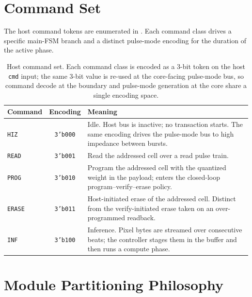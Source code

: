 \section{Command Set}
\label{sec:arch-commands}

The host command tokens are enumerated in . Each
command class drives a specific main-FSM branch and a distinct pulse-mode
encoding for the duration of the active phase.

\begin{table}[h]
    \centering
    \caption{Host command set. Each command class is encoded as a 3-bit
        token on the host \texttt{cmd} input; the same 3-bit value is
        re-used at the core-facing pulse-mode bus, so command decode at
        the boundary and pulse-mode generation at the core share a
        single encoding space.}
    \label{tab:cmd-set}
    \begin{tabularx}{\linewidth}{l c X}
        \toprule
        \textbf{Command} & \textbf{Encoding} & \textbf{Meaning} \\
        \midrule
        \texttt{HIZ}  & \texttt{3'b000} &
            Idle. Host bus is inactive; no transaction starts. The same
            encoding drives the pulse-mode bus to high impedance between
            bursts. \\
        \texttt{READ} & \texttt{3'b001} &
            Read the addressed cell over a read pulse train. \\
        \texttt{PROG} & \texttt{3'b010} &
            Program the addressed cell with the quantized weight in the
            payload; enters the closed-loop program--verify--erase
            policy. \\
        \texttt{ERASE}& \texttt{3'b011} &
            Host-initiated erase of the addressed cell. Distinct from
            the verify-initiated erase taken on an over-programmed
            readback. \\
        \texttt{INF}  & \texttt{3'b100} &
            Inference. Pixel bytes are streamed over consecutive beats;
            the controller stages them in the buffer and then runs a
            compute phase. \\
        \bottomrule
    \end{tabularx}
\end{table}

\section{Module Partitioning Philosophy}
\label{sec:arch-partitioning}

